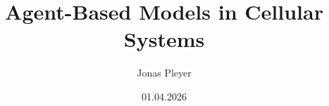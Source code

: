 \usepackage[utf8]{inputenc}

\usepackage[cut=false]{thmbox}

\usepackage[printonlyused,withpage]{acronym}
\usepackage{amsmath,amssymb}
\usepackage{algorithm}
\usepackage{algpseudocode}
\usepackage[USenglish]{babel}
\usepackage[
    style=numeric,
    citestyle=numeric-comp,
    backend=biber,
    natbib=true,
    url=false,
    doi=true,
    eprint=false,
    sorting=none
]{biblatex}
\usepackage{booktabs}
\usepackage{color}
\usepackage{epigraph}
\usepackage{enumitem}
\usepackage{float}
\usepackage{graphicx}
\usepackage[hidelinks]{hyperref}
\usepackage{listings}
\usepackage{listings-rust/listings-rust}
\usepackage{makecell}
\usepackage{mathtools}
\usepackage{mathrsfs}
\usepackage[skip=6pt plus 2pt]{parskip}
\usepackage{rotating}
\usepackage{siunitx}
\usepackage{tabularx}
\usepackage{tikz}
\usepackage{tikz-cd}
\usepackage{onimage}
\usepackage{standalone}

\usepackage{fancyhdr}
\fancyfoot{} %
\fancyhead[L]{\rightmark}
\fancyfoot[RO,LE]{\thepage}


\setlength{\headheight}{13.6pt}



\renewcommand*{\bibfont}{\normalfont\small}

\DeclareSIUnit{}

\newcommand{\subtitle}{On Theory, Implementation and Application}

\makeatletter
\title{Agent-Based Models in Cellular Systems}\let\Title\@title
\author{Jonas Pleyer}\let\Author\@author
\date{01.04.2026}\let\Date\@date
\makeatother


